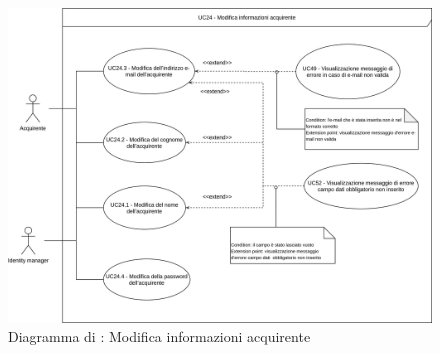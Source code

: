 
\label{modifica-informazioni-acquirente}

\begin{figure}[H]
    \centering
    \includegraphics[scale=0.6]{Immagini/DiagrammiUC/ModificaInformazioniAcquirente.png}
    \caption{Diagramma di \actualUC: Modifica informazioni acquirente}
    \label{fig:modifica-informazioni-acquirente}
\end{figure}

